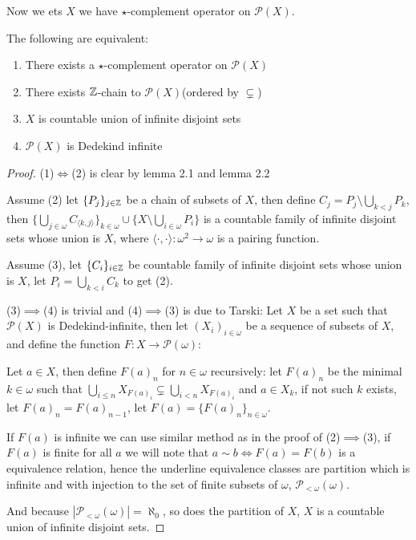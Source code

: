 	Now we ets $X$ we have $\star$-complement operator on $\mathcal{P}(X)$.
	
	\begin{theorem}
		The following are equivalent:
		\begin{enumerate}
			\item{ There exists a $\star$-complement operator on $\mathcal{P}(X)$}
			\item{ There exists $\Bbb{Z}$-chain to $\mathcal{P}(X)$(ordered by $\subsetneq$)}
			\item{ $X$ is countable union of infinite disjoint sets}
			\item{ $\mathcal{P}(X)$ is Dedekind infinite}
		\end{enumerate}
	\end{theorem}
	\begin{proof}
		(1)$\iff$(2) is clear by lemma 2.1 and lemma 2.2 
		
		Assume (2) let $\{P_j\}_{j\in\Bbb{Z}}$ be a chain of subsets of $X$, then define $C_j=P_j\setminus\bigcup_{k<j}P_k$, then $\{\bigcup_{j\in\omega}C_{\langle k,j\rangle}\}_{k\in\omega}\cup\{X\setminus\bigcup_{i\in \omega}P_i\}$ is a countable family of infinite disjoint sets whose union is $X$, where $\langle\cdot,\cdot\rangle:\omega^2\to\omega$ is a pairing function.
		
		Assume (3), let $\{C_i\}_{i\in\Bbb{Z}}$ be countable family of infinite disjoint sets whose union is $X$, let $P_i=\bigcup_{k<i}C_k$ to get (2).
		
		(3)$\implies$(4) is trivial and (4)$\implies$(3) is due to Tarski\cite{SurLesEnsemblesFinis}:
		Let $X$ be a set such that $\mathcal{P}(X)$ is Dedekind-infinite, then let $(X_i)_{i\in\omega}$ be a sequence of subsets of $X$, and define the function $F:X\to\mathcal{P}(\omega)$:
		
		Let $a\in X$, then define $F(a)_n$ for $n\in\omega$ recursively: let $F(a)_n$ be the minimal $k\in\omega$ such that $\bigcup_{i\le n} X_{F(a)_i}\subsetneq \bigcup_{i< n} X_{F(a)_i}$ and $a\in X_k$, if not such $k$ exists, let $F(a)_n=F(a)_{n-1}$, let $F(a)=\{F(a)_n\}_{n\in\omega}$.
		
		If $F(a)$ is infinite we can use similar method as in the proof of (2)$\implies$(3), if $F(a)$ is finite for all $a$ we will note that $a\sim b\iff F(a)=F(b)$ is a equivalence relation, hence the underline equivalence classes are partition which is infinite and with injection to the set of finite subsets of $\omega$, $\mathcal{P}_{<\omega}(\omega)$.
		
		And because $|\mathcal{P}_{<\omega}(\omega)|=\aleph_0$, so does the partition of $X$, $X$ is a countable union of infinite disjoint sets.
	\end{proof}
	
